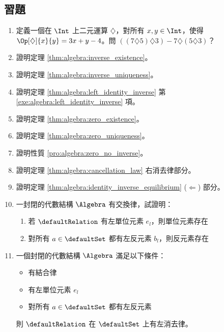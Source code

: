 \documentclass[12pt,a4paper,oneside]{report}
\begin{document}
\begin{CJK}{UTF8}{bkai}
\section*{習題}
\begin{enumerate}
\item 定義一個在 $\Int$ 上二元運算 $\diamondsuit$，對所有 $x,y\in{\Int}$，使得 $\Op[\diamondsuit]{x}{y}=3x+y-4$。問 ${({(7\diamondsuit{5})}\diamondsuit{3})}-{7\diamondsuit{(5\diamondsuit{3})}}$？
\item 證明定理 \ref{thm:algebra:inverse_existence}。
\item 證明定理 \ref{thm:algebra:inverse_uniqueness}。
\item 證明定理 \ref{thm:algebra:left_identity_inverse} 第 \ref{exe:algebra:left_identity_inverse} 項。
\item 證明定理 \ref{thm:algebra:zero_existence}。
\item 證明定理 \ref{thm:algebra:zero_uniqueness}。
\item 證明性質 \ref{pro:algebra:zero_no_inverse}。
\item 證明定理 \ref{thm:algebra:cancellation_law} 右消去律部分。
\item 證明定理 \ref{thm:algebra:identity_inverse_equilibrium} ($\Leftarrow$) 部分。
\item 一封閉的代數結構 $\Algebra$ 有交換律，試證明：
\begin{enumerate}
\item 若 $\defaultRelation$ 有左單位元素 $e_l$，則單位元素存在
\item 對所有 $a\in{\defaultSet}$ 都有左反元素 $b_l$，則反元素存在
\end{enumerate}
\item 一個封閉的代數結構 $\Algebra$ 滿足以下條件：
\begin{itemize}
\item 有結合律
\item 有左單位元素 $e_l$
\item 對所有 $a\in{\defaultSet}$ 都有左反元素
\end{itemize}
則 $\defaultRelation$ 在 $\defaultSet$ 上有左消去律。
\end{enumerate}

\ifx \allfiles \undefined
\printindex[noun]

\clearpage
\end{CJK}
\end{document}
